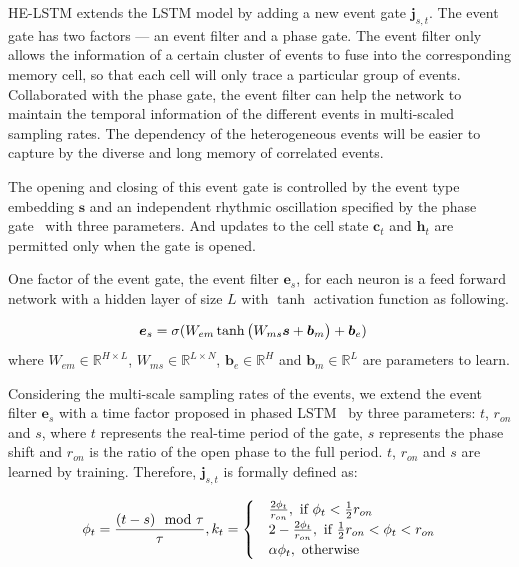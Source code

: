 \documentclass[letterpaper]{article} %
\begin{document}
HE-LSTM extends the LSTM model by adding a new event gate $\bm j_{s,t}$.
The event gate has two factors --- an event filter and a phase gate. The event filter only allows the information of a certain cluster of events to fuse into the corresponding memory cell, so that each cell will only trace a particular group of events. Collaborated with the phase gate, the event filter can help the network to maintain the temporal information of the different events in multi-scaled sampling rates. The dependency of the heterogeneous events will be easier to capture by the diverse and long memory of correlated events.

The
opening and closing of this event gate is controlled by the event type embedding $\bm s$ and an independent rhythmic oscillation specified by the phase gate~\cite{neil2016phased} with three parameters.
And updates to the cell state $\bm c_t$ and $\bm h_t$ are permitted only when the gate is opened.

One factor of the event gate, the event filter $\bm e_{s}$, for each neuron is a feed forward network with a hidden layer of size $L$ with $\tanh$ activation function as following.

\begin{align}
\setlength{\abovedisplayskip}{3pt}
\bm e_s &=  \sigma(W_{em} \tanh\big (W_{ms} \bm s + \bm b_m \big) + \bm b_e)
\setlength{\belowdisplayskip}{3pt}
\end{align}
where $ W_{em} \in \mathbb{R}^{H\times L }$, $ W_{ms} \in \mathbb{R}^{L\times N}$, $\bm b_e\in \mathbb{R}^{H}$ and $\bm b_m\in \mathbb{R}^{L}$ are parameters to learn.


Considering the multi-scale sampling rates of the events, we extend  the event filter $\bm e_s$ with a time factor proposed in phased LSTM~\cite{neil2016phased} by three parameters:  $t$, $r_{on}$ and $s$, where $t$ represents
the real-time period of the gate, $s$ represents the phase shift and
$r_{on}$ is the ratio of the open phase to the full period. $t$, $r_{on}$ and $s$ are learned by training. Therefore, $\bm j_{s,t}$ is formally defined as:

\begin{align}
\setlength{\abovedisplayskip}{3pt}
\phi_t = \frac{(t-s)\mod \tau}{\tau},
k_t = \begin{cases}
& \frac{2\phi_t}{r_{on}},\text{ if } \phi_t < \frac{1}{2}r_{on} \\
& 2-\frac{2\phi_t}{r_{on}},\text{ if } \frac{1}{2}r_{on} < \phi_t < r_{on}  \\
& \alpha\phi_t,\text{ otherwise }
\end{cases}
\setlength{\belowdisplayskip}{3pt}
\end{align}
\end{document}
